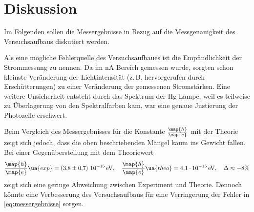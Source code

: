 \section{Diskussion}
Im Folgenden sollen die Messergebnisse in Bezug auf die Messgenauigkeit des
Versuchsaufbaus diskutiert werden. %

Als eine mögliche Fehlerquelle des Versuchsaufbaues ist die Empfindlichkeit der
Strommessung zu nennen. Da im $\si{\nano\ampere}$ Bereich gemessen wurde, sorgten schon kleinste %
Veränderung der Lichtintensität (z.\,B. hervorgerufen durch Erschütterungen) zu einer Veränderung der gemessenen Stromstärken. %
Eine weitere Unsicherheit entsteht durch das Spektrum der Hg-Lampe,  %
weil es teilweise zu Überlagerung von den Spektralfarben kam, war eine genaue Justierung der Photozelle erschwert.

Beim Vergleich des Messergebnisses für die Konstante $\frac{\map{h}}{\map{e}}$ mit der Theorie
zeigt sich jedoch, dass die oben beschriebenden Mängel kaum ins Gewicht fallen.
Bei einer Gegenüberstellung mit dem Theoriewert\cite{scipy} %
\begin{equation}
  \label{eq:abweichung}
  \frac{\map{h}}{\map{e}}\ua{exp}=\left(\num{3.8\pm 0.7}\right)\,\num{e-15}\,\si{\eV}, \quad  \frac{\map{h}}{\map{e}}\ua{theo}=\num{4.1 e-15}\,\si{\eV}, \quad \Delta\approx -8\%
\end{equation}
zeigt sich eine geringe Abweichung zwischen Experiment und Theorie.
Dennoch könnte eine Verbesserung des Versuchsaufbaus
für eine Verringerung der Fehler in \eqref{eq:messergebnisse} sorgen.

